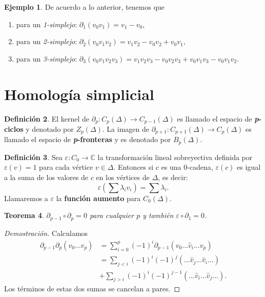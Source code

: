 \documentclass[12pt]{book}
\newtheorem{theorem}{Teorema}[section]
\theoremstyle{definition}
\newtheorem{definition}[theorem]{Definición}
\newtheorem{example}[theorem]{Ejemplo}
\newcounter{in}
\newcounter{ini}
\begin{document}
\begin{example}
  De acuerdo a lo anterior, tenemos que
  \begin{enumerate}
  \item para un \emph{1-simplejo}: $\partial_{1}(v_{0}v_{1})= v_{1}-v_{0}$,
  \item para un \emph{2-simplejo}: $\partial_{2}(v_{0}v_{1}v_{2})=v_{1}v_{2}-v_{0}v_{2}+v_{0}v_{1}$,
  \item para un \emph{3-simplejo}:
    $\partial_{3}(v_{0}v_{1}v_{2}v_{3})=v_{1}v_{2}v_{3}-v_{0}v_{2}v_{3}+v_{0}v_{1}v_{3}-v_{0}v_{1}v_{2}$. 
  \end{enumerate}
\end{example}

\section{Homología simplicial}
\label{hom-simp}

\begin{definition}
   El kernel de $\partial_{p}:C_{p}(\Delta)\rightarrow
   C_{p-1}(\Delta)$ es llamado el espacio de
   \textbf{\emph{p}-ciclos} y denotado por $Z_{p}(\Delta)$. La imagen
   de $\partial_{p+1}:C_{p+1}(\Delta)\rightarrow C_{p}(\Delta)$ es
   llamado el espacio de \textbf{\emph{p}-fronteras} y es denotado por $B_{p}(\Delta)$.
\end{definition}

\begin{definition}
  Sea $\varepsilon:C_{0}\rightarrow \mathbb{C}$ la transformación
  lineal sobreyectiva definida por $\varepsilon(v)=1$ para cada
  vértice $v\in \Delta$. Entonces si $c$ es una $0$-cadena,
  $\varepsilon(c)$ es igual a la suma de los valores de $c$ en los
  vértices de $\Delta$, es decir:
  $$\varepsilon(\sum \lambda_{i}v_{i})=\sum\lambda_{i}.$$
  Llamaremos a $\varepsilon$ la \textbf{función aumento} para
  $C_{0}(\Delta)$.
\end{definition}

\begin{theorem}
  $\partial_{p-1}\circ\partial_{p}=0$ para cualquier $p$ y también $\varepsilon\circ\partial_{1}=0$.
\end{theorem}

\begin{proof}[Demostración]
  Calculamos
  \begin{align*}
    \partial_{p-1}\partial_{p}(v_{0}\ldots
    v_{p})&=\sum_{i=0}^{p}(-1)^{i}\partial_{p-1}(v_{0}\ldots \widehat v_{i}\ldots v_{p})\\
    &=\sum_{j<i}(-1)^{i}(-1)^{j}(\ldots \widehat v_{j} \ldots \widehat v_{i} \ldots)\\
    &+\sum_{j>i}(-1)^{i}(-1)^{j-1}(\ldots\widehat v_{i}\ldots \widehat
    v_{j}\ldots).
  \end{align*}
  Los términos de estas dos sumas se cancelan a pares.
\end{proof}
\end{document}
